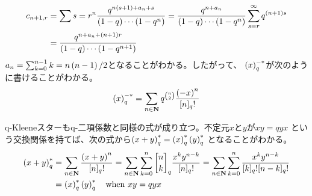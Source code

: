 {\begin{equation*}
\begin{split}
		c_{n+1,r} &= \sum{s=r}^n \frac{q^{n(s+1) + a_n + s}}
			{\mathinner{\left({1 - q}\right)}\cdots\mathinner{\left({1 - q^n}\right)}}
		= \frac{q^{n + a_n}}{\mathinner{\left({1 - q}\right)}\cdots\mathinner{\left({1 - q^n}\right)}}
			\sum_{s=r}^\infty q^{\mathinner{\left({n+1}\right)}s} \\
		&= \frac{q^{n + a_n + \mathinner{\left({n+1}\right)}r}}{\mathinner{\left({1 - q}\right)}\cdots\mathinner{\left({1 - q^{n+1}}\right)}}
	\end{split}\end{equation*}
	$a_n=\sum_{k=0}^{n-1}k=n\mathinner{\left({n-1}\right)}/2$となることがわかる。したがって、
	$\mathinner{\left({x}\right)}_q^{-*}$が次のように書けることがわかる。
	\begin{equation*}\begin{split}
		\mathinner{\left({x}\right)}_q^{-*} = \sum_{n\in\mathbf{N}} q^{\binom{n}{2}}
			\frac{\mathinner{\left({-x}\right)}^n}{[n]_q!}
	\end{split}\end{equation*}

	q-Kleeneスターもq-二項係数と同様の式が成り立つ。不定元$x$と$y$が$xy=qyx$
	という交換関係を持てば、次の式から$\mathinner{\left({x+y}\right)}_q^*=\mathinner{\left({x}\right)}_q^*\mathinner{\left({y}\right)}_q^*$
	となることがわかる。
	\begin{equation*}\begin{split}
		\plr{x+y}_q^* &= \sum_{n\in\sizen} \frac{\plr{x+y}^n}{[n]_q!}
		= \sum_{n\in\sizen}\sum_{k=0}^n \qbinom{n}{k}_q\frac{x^ky^{n-k}}{[n]_q!}
		= \sum_{n\in\sizen}\sum_{k=0}^n \frac{x^ky^{n-k}}{[k]_q![n-k]_q!} \\
		&= \plr{x}_q^*\plr{y}_q^* \quad\text{when } xy = qyx
	\end{split}\end{equation*}

}
